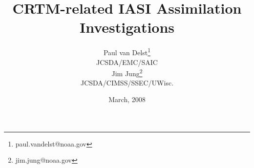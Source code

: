 



\title{CRTM-related IASI Assimilation Investigations}
\author{Paul van Delst\footnote{paul.vandelst@noaa.gov}\\JCSDA/EMC/SAIC\\[0.25in]
        Jim Jung\footnote{jim.jung@noaa.gov}\\JCSDA/CIMSS/SSEC/UWisc.}
\date{March, 2008}




\maketitle

\draftwatermark












